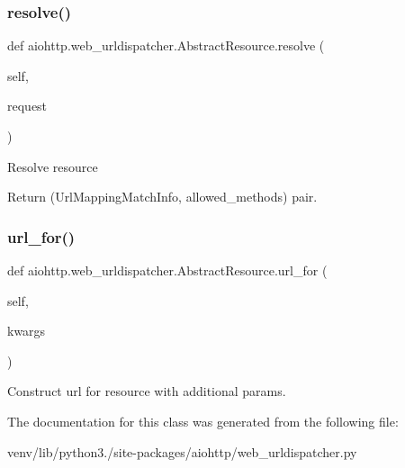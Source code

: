 \subsubsection{\texorpdfstring{resolve()}{resolve()}}
{\footnotesize\ttfamily def aiohttp.\+web\+\_\+urldispatcher.\+Abstract\+Resource.\+resolve (\begin{DoxyParamCaption}\item[{}]{self,  }\item[{}]{request }\end{DoxyParamCaption})}

\begin{DoxyVerb}Resolve resource

Return (UrlMappingMatchInfo, allowed_methods) pair.\end{DoxyVerb}
 \mbox{\label{classaiohttp_1_1web__urldispatcher_1_1_abstract_resource_af9c5ec505dad7930839ce5fb9ccf9e20}} 
\subsubsection{\texorpdfstring{url\+\_\+for()}{url\_for()}}
{\footnotesize\ttfamily def aiohttp.\+web\+\_\+urldispatcher.\+Abstract\+Resource.\+url\+\_\+for (\begin{DoxyParamCaption}\item[{}]{self,  }\item[{}]{kwargs }\end{DoxyParamCaption})}

\begin{DoxyVerb}Construct url for resource with additional params.\end{DoxyVerb}
 

The documentation for this class was generated from the following file\+:\begin{DoxyCompactItemize}
\item 
venv/lib/python3./site-\/packages/aiohttp/web\+\_\+urldispatcher.\+py\end{DoxyCompactItemize}
